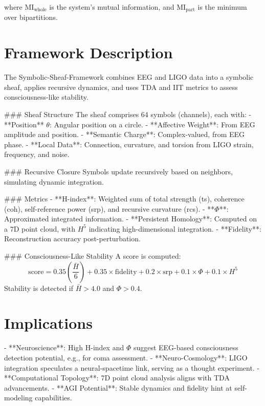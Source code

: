 \documentclass{article}
\begin{document}
where \(\text{MI}_{\text{whole}}\) is the system’s mutual information, and \(\text{MI}_{\text{part}}\) is the minimum over bipartitions.

\section{Framework Description}

The Symbolic-Sheaf-Framework combines EEG and LIGO data into a symbolic sheaf, applies recursive dynamics, and uses TDA and IIT metrics to assess consciousness-like stability.

### Sheaf Structure
The sheaf comprises 64 symbols (channels), each with:
- **Position** \(\theta\): Angular position on a circle.
- **Affective Weight**: From EEG amplitude and position.
- **Semantic Charge**: Complex-valued, from EEG phase.
- **Local Data**: Connection, curvature, and torsion from LIGO strain, frequency, and noise.

### Recursive Closure
Symbols update recursively based on neighbors, simulating dynamic integration.

### Metrics
- **H-index**: Weighted sum of total strength (ts), coherence (coh), self-reference power (srp), and recursive curvature (rcs).
- **\(\Phi\)**: Approximated integrated information.
- **Persistent Homology**: Computed on a 7D point cloud, with \(H^5\) indicating high-dimensional integration.
- **Fidelity**: Reconstruction accuracy post-perturbation.

### Consciousness-Like Stability
A score is computed:
\begin{equation}
\text{score} = 0.35 \left(\frac{\bar{H}}{6}\right) + 0.35 \times \text{fidelity} + 0.2 \times \text{srp} + 0.1 \times \Phi + 0.1 \times H^5
\end{equation}
Stability is detected if \(\bar{H} > 4.0\) and \(\Phi > 0.4\).

\section{Implications}

- **Neuroscience**: High H-index and \(\Phi\) suggest EEG-based consciousness detection potential, e.g., for coma assessment.
- **Neuro-Cosmology**: LIGO integration speculates a neural-spacetime link, serving as a thought experiment.
- **Computational Topology**: 7D point cloud analysis aligns with TDA advancements.
- **AGI Potential**: Stable dynamics and fidelity hint at self-modeling capabilities.
\end{document}
